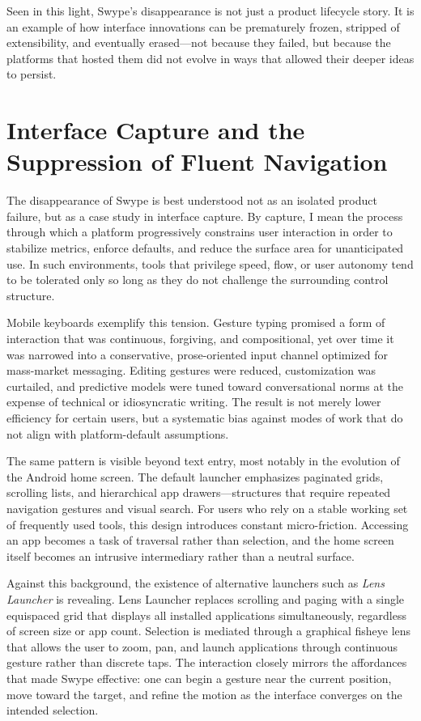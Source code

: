 \documentclass[11pt]{article}
\begin{document}
Seen in this light, Swype’s disappearance is not just a product lifecycle story. It is an example of how interface innovations can be prematurely frozen, stripped of extensibility, and eventually erased—not because they failed, but because the platforms that hosted them did not evolve in ways that allowed their deeper ideas to persist.

\section{Interface Capture and the Suppression of Fluent Navigation}

The disappearance of Swype is best understood not as an isolated product failure, but as a case study in interface capture. By capture, I mean the process through which a platform progressively constrains user interaction in order to stabilize metrics, enforce defaults, and reduce the surface area for unanticipated use. In such environments, tools that privilege speed, flow, or user autonomy tend to be tolerated only so long as they do not challenge the surrounding control structure.

Mobile keyboards exemplify this tension. Gesture typing promised a form of interaction that was continuous, forgiving, and compositional, yet over time it was narrowed into a conservative, prose-oriented input channel optimized for mass-market messaging. Editing gestures were reduced, customization was curtailed, and predictive models were tuned toward conversational norms at the expense of technical or idiosyncratic writing. The result is not merely lower efficiency for certain users, but a systematic bias against modes of work that do not align with platform-default assumptions.

The same pattern is visible beyond text entry, most notably in the evolution of the Android home screen. The default launcher emphasizes paginated grids, scrolling lists, and hierarchical app drawers—structures that require repeated navigation gestures and visual search. For users who rely on a stable working set of frequently used tools, this design introduces constant micro-friction. Accessing an app becomes a task of traversal rather than selection, and the home screen itself becomes an intrusive intermediary rather than a neutral surface.

Against this background, the existence of alternative launchers such as \textit{Lens Launcher} is revealing. Lens Launcher replaces scrolling and paging with a single equispaced grid that displays all installed applications simultaneously, regardless of screen size or app count. Selection is mediated through a graphical fisheye lens that allows the user to zoom, pan, and launch applications through continuous gesture rather than discrete taps. The interaction closely mirrors the affordances that made Swype effective: one can begin a gesture near the current position, move toward the target, and refine the motion as the interface converges on the intended selection.
\end{document}
